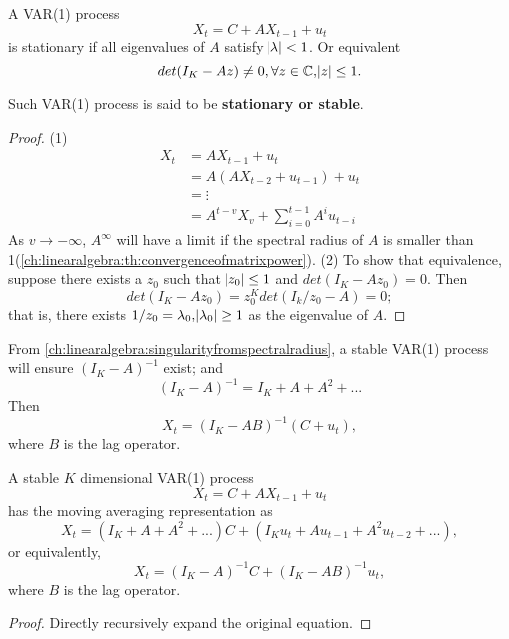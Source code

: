 \begin{lemma}\cite[32]{tsay2013multivariate}\label{ch:time-series-analysis:th:stationaryConditionForVAR(1)}
A VAR(1) process $$X_t = C + A X_{t-1} + u_t$$
is stationary if all eigenvalues of $A$ satisfy $
\abs{\lambda} < 1$. 	
Or equivalent 
$$det(I_K - Az) \neq 0, \forall z\in \mathbb{C},  \abs{z} \leq 1. $$

Such VAR(1) process is said to be \textbf{stationary or stable}.
\end{lemma}
\begin{proof}
(1)
\begin{align*}
X_t &= AX_{t-1} + u_t \\
&= A(AX_{t-2} + u_{t-1}) + u_t \\
&= \vdots \\
&= A^{t-v}X_{v} + \sum_{i=0}^{t-1} A^i u_{t-i}
\end{align*}
As $v\to -\infty$, $A^\infty$ will have a limit if the spectral radius of $A$ is smaller than 1(\autoref{ch:linearalgebra:th:convergenceofmatrixpower}). 
(2)
To show that equivalence, suppose there exists a $z_0$ such that $\abs{z_0} \leq 1$ and $det(I_K - Az_0) = 0$. 
Then
$$det(I_K - Az_0) = z_0^K det(I_k/z_0 - A) = 0;$$
that is, there exists $1/z_0 = \lambda_0, \abs{\lambda_0} \geq 1$ as the eigenvalue of $A$.
\end{proof}

\begin{note}
From \autoref{ch:linearalgebra:singularityfromspectralradius}, a stable VAR(1) process will ensure
$(I_K - A)^{-1}$
exist; and
$$(I_K - A)^{-1} = I_K + A + A^2 + ...$$
Then
$$X_t = (I_K-AB)^{-1}(C + u_t),$$
where $B$ is the lag operator.
\end{note}

\begin{lemma}\label{ch:time-series-analysis:th:VectorMARepresentationStableVAR(1)}\cite[36]{tsay2013multivariate}
	A stable $K$ dimensional VAR(1) process 
	$$X_t = C + A X_{t-1} + u_t$$
	has the moving averaging representation as
	$$X_t = (I_K + A + A^2 + ... )C + (I_Ku_t + Au_{t-1} + A^2u_{t-2} + ...),$$
	or equivalently,
	$$X_t = (I_K -A)^{-1}C + (I_K-AB)^{-1}u_t,$$
where $B$ is the lag operator.	
\end{lemma}
\begin{proof}
	Directly recursively expand the original equation.
\end{proof}



